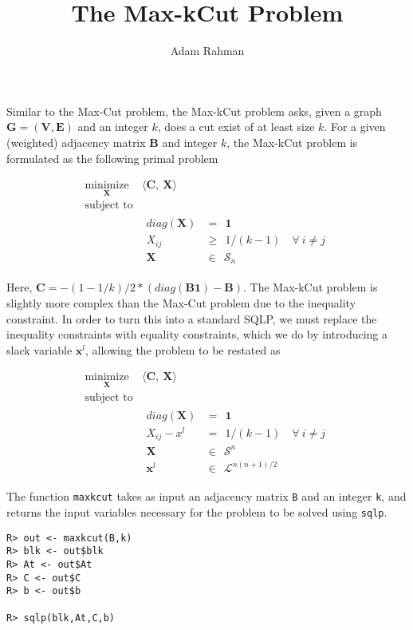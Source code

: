 \documentclass{article}
\author{Adam Rahman}
\title{The Max-kCut Problem}
\newcommand{\ve}[1]{\mathbf{#1}}           %
\newcommand{\m}[1]{\mathbf{#1}}               %
\begin{document}
\maketitle

Similar to the Max-Cut problem, the Max-kCut problem asks, given a graph $\m{G} = (\m{V},\m{E})$ and an integer $k$, does a cut exist of at least size $k$. For a given (weighted) adjacency matrix $\m{B}$ and integer $k$, the Max-kCut problem is formulated as the following primal problem

\[
\begin{array}{ll}
\underset{\m{X}}{\text{minimize}} & \langle \m{C},~\m{X} \rangle \\
\text{subject to} & \\
 & \begin{array}{rl}
diag(\m{X}) &=~~\ve{1} \\
X_{ij} &\geq~~ 1/(k-1) \quad \forall~i \neq j\\
\m{X} &\in ~~\mathcal{S}_{n}
\end{array}
\end{array}
\]

Here, $\m{C} = -(1-1/k)/2 * (diag(\m{B}\ve{1})-\m{B})$. The Max-kCut problem is slightly more complex than the Max-Cut problem due to the inequality constraint. In order to turn this into a standard SQLP, we must replace the inequality constraints with equality constraints, which we do by introducing a slack variable $\ve{x}^{l}$, allowing the problem to be restated as

\[
\begin{array}{ll}
\underset{\m{X}}{\text{minimize}}  & \langle \m{C},~\m{X} \rangle \\
\text{subject to} & \\
 & \begin{array}{rl}
diag(\m{X}) &=~~\ve{1} \\
X_{ij} - x^{l} &=~~ 1/(k-1) \quad \forall~i \neq j\\
\m{X} &\in ~~\mathcal{S}^{n} \\
\ve{x}^{l} &\in ~~ \mathcal{L}^{n(n+1)/2} 
\end{array}
\end{array}
\]

The function \verb!maxkcut! takes as input an adjacency matrix \verb!B! and an integer \verb!k!, and returns the input variables necessary for the problem to be solved using \verb!sqlp!.

\begin{verbatim}
R> out <- maxkcut(B,k)
R> blk <- out$blk
R> At <- out$At
R> C <- out$C
R> b <- out$b

R> sqlp(blk,At,C,b)
\end{verbatim}
\end{document}
